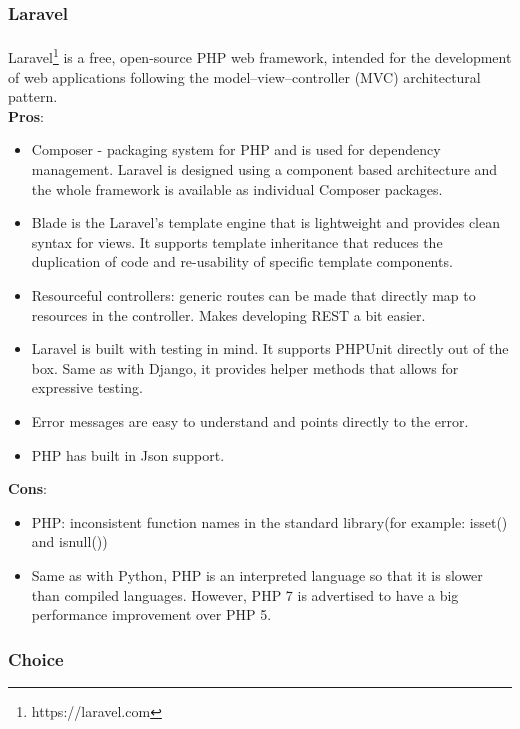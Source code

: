 \documentclass{l4proj}
\begin{document}
\subsubsection{Laravel}
\paragraph{}
Laravel\footnote{https://laravel.com} is a free, open-source PHP web framework, intended for the development of web applications following the model–view–controller (MVC) architectural pattern.
\\ \textbf{Pros}:
\begin{itemize}
	\item Composer - packaging system for PHP and is used for dependency management. Laravel is designed using a component based architecture and the whole framework is available as individual Composer packages. 
	\item Blade is the Laravel's template engine that is lightweight and provides clean syntax for views. It supports template inheritance that reduces the duplication of code and re-usability of specific template components. 
	\item Resourceful controllers: generic routes can be made that directly map to resources in the controller. Makes developing REST a bit easier.
	\item Laravel is built with testing in mind. It supports PHPUnit directly out of the box. Same as with Django, it provides helper methods that allows for expressive testing.  
	\item Error messages are easy to understand and points directly to the error.
	\item PHP has built in Json support.
\end{itemize}
\textbf{Cons}:
\begin{itemize}
	\item PHP: inconsistent function names in the standard library(for example: isset() and isnull())
	\item Same as with Python, PHP is an interpreted language so that it is slower than compiled languages. However, PHP 7 is advertised to have a big performance improvement over PHP 5.
\end{itemize}

\subsubsection{Choice}
\end{document}

